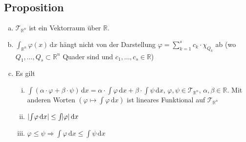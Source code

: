 \subsection[Proposition: Eigenschaften von Treppenfunktionen]{Proposition} %
\label{sub:33}
\begin{enumerate}[a)]
	\item $\mathcal{T}_{\mathds{R}^n}$ ist ein Vektorraum über $\mathds{R}$.
	\item $\int_{\mathds{R}^n} \! \varphi(x)  \, \mathrm{d}x$ hängt nicht von der Darstellung $\varphi = \sum_{k=1}^{s} c_k \cdot \chi_{Q_k}$ ab (wo 
	$Q_1, \ldots , Q_s \subset \mathds{R}^n$ Quader sind und $c_1, \ldots , c_s \in \mathds{R}$)
	\item Es gilt 
	\begin{enumerate}[(i)]
		\item $\int(\alpha \cdot \varphi + \beta \cdot \psi)  \, \mathrm{d}x  = \alpha \cdot  \int \! \varphi  \, \mathrm{d}x  + \beta \cdot \int\! \psi  \, \mathrm{d}x  $,
		$\varphi, \psi \in \mathcal{T}_{\mathds{R}^n}$, $\alpha, \beta \in \mathds{R}$. Mit anderen Worten $(\varphi \mapsto \int\! \varphi  \, \mathrm{d}x )$ ist lineares
		Funktional auf $\mathcal{T}_{\mathds{R}^n}$
		\item $\lvert\int\! \varphi  \, \mathrm{d}x \rvert \le \int \! \lvert\varphi\rvert  \, \mathrm{d}x   $
		\item $\varphi \le \psi \Longrightarrow \int \! \varphi  \, \mathrm{d}x  \le \int\! \psi  \, \mathrm{d}x  $
	\end{enumerate}
\end{enumerate}
